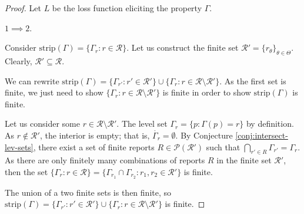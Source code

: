 \documentclass[12pt]{article}
\newcommand{\E}{\mathbb{E}}
\newcommand{\R}{\mathcal{R}}
\newcommand{\inter}[1]{\mathring{#1}}%
\newcommand{\strip}{\text{strip}}
\DeclareMathOperator*{\argmin}{arg\,min}
\begin{document}
\begin{proof}
Let $L$ be the loss function eliciting the property $\Gamma$.

$1 \implies 2$. 


Consider $\strip(\Gamma) = \{\Gamma_r : r \in \R \}$.
Let us construct the finite set $\R' = \{r_\theta \}_{\theta \in \Theta}$.
Clearly, $\R' \subseteq \R$.

We can rewrite $\strip(\Gamma) = \{\Gamma_{r'} : r' \in \R' \} \cup \{\Gamma_{r} : r \in \R \setminus \R' \}$.
As the first set is finite, we just need to show $\{\Gamma_{r} : r \in \R \setminus \R' \}$ is finite in order to show $\strip(\Gamma)$ is finite.

Let us consider some $r\in\R \setminus \R'$.
The level set $\Gamma_r = \{p : \Gamma(p) = r\}$ by definition.
As $r \not\in \R'$, the interior is empty; that is, $\inter{\Gamma_r} = \emptyset$.
By Conjecture \ref{conj:intersect-lev-sets}, there exist a set of finite reports $R \in \mathscr{P}(\R')$ such that $\bigcap_{r'\in R} \Gamma_{r'} = \Gamma_r$.
As there are only finitely many combinations of reports $R$ in the finite set $\R'$, then the set $\{ \Gamma_r : r \in \R \} = \{ \Gamma_{r_1} \cap \Gamma_{r_2} : r_1, r_2 \in \R' \}$ is finite.


The union of a two finite sets is then finite, so $\strip(\Gamma) = \{ \Gamma_{r'} : r' \in \R' \} \cup \{ \Gamma_r : r \in \R \setminus \R' \}$ is finite.








\end{proof}
\end{document}
